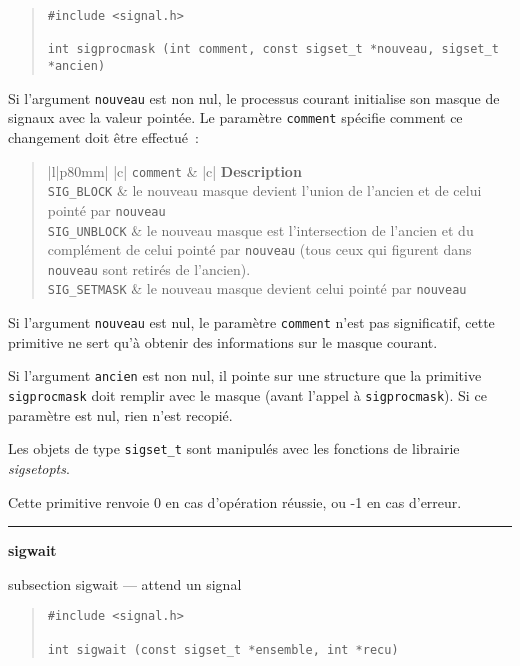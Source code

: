 \documentclass [twoside] {report}
\newcommand {\primitive} [1]
    {
	\phantomsection
	{\large \bf #1}
	\addcontentsline {toc} {subsection} {#1}
    }
\newcommand {\separation}
    {
	\vspace {5mm}
	\nopagebreak
	\hrule
    }
\begin{document}
\begin {quote}
\begin {verbatim}
#include <signal.h>

int sigprocmask (int comment, const sigset_t *nouveau, sigset_t *ancien)
\end{verbatim}
\end {quote}

Si l'argument {\tt nouveau} est non nul, le processus courant initialise
son masque de signaux avec la valeur pointée. Le paramètre {\tt comment}
spécifie comment ce changement doit être effectué~:

\begin {quote}
\begin {tabular} {|l|p{80mm}|} \hline
     {|c|} {\tt comment}
	&  {|c|} {\bf Description}
	\\ \hline
    \verb:SIG_BLOCK:
	& le nouveau masque devient l'union de l'ancien et de celui pointé
	    par {\tt nouveau}
	\\ \hline
    \verb:SIG_UNBLOCK:
	& le nouveau masque est l'intersection de l'ancien et du
	    complément de celui pointé par {\tt nouveau} (tous ceux qui
	    figurent dans {\tt nouveau} sont retirés de l'ancien).
	\\ \hline
    \verb:SIG_SETMASK:
	& le nouveau masque devient celui pointé par {\tt nouveau}
	\\ \hline
\end {tabular}
\end {quote}

Si l'argument {\tt nouveau} est nul, le paramètre {\tt comment}
n'est pas significatif, cette primitive ne sert qu'à obtenir des
informations sur le masque courant.

Si l'argument {\tt ancien} est non nul, il pointe sur une structure que
la primitive {\tt sigprocmask} doit remplir avec le masque (avant
l'appel à {\tt sigprocmask}).  Si ce paramètre est nul, rien n'est
recopié.

Les objets de type {\tt sigset\_t} sont manipulés avec les fonctions de
librairie {\em sigsetopts}.

Cette primitive renvoie 0 en cas d'opération réussie, ou -1 en cas
d'erreur.



\separation
\primitive {sigwait} --- attend un signal
    \label {sigwait}

\begin {quote}
\begin {verbatim}
#include <signal.h>

int sigwait (const sigset_t *ensemble, int *recu)
\end{verbatim}
\end {quote}
\end{document}

